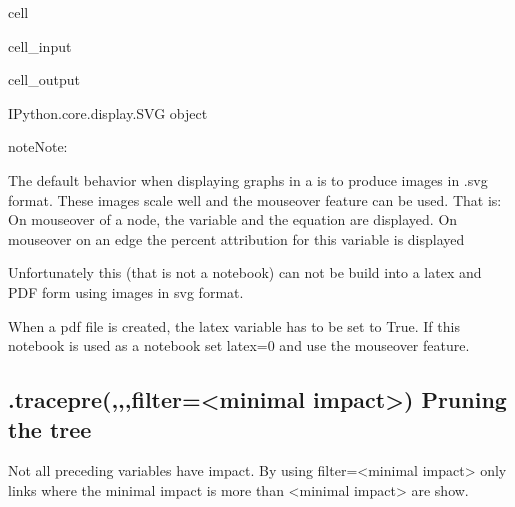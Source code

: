 \documentclass[letterpaper,10pt,english]{jupyterBook}
\begin{document}
\begin{sphinxuseclass}{cell}\begin{sphinxVerbatimInput}

\begin{sphinxuseclass}{cell_input}
\begin{sphinxVerbatim}[commandchars=\\\{\}]
\end{sphinxVerbatim}

\end{sphinxuseclass}\end{sphinxVerbatimInput}
\begin{sphinxVerbatimOutput}

\begin{sphinxuseclass}{cell_output}
\begin{sphinxVerbatim}[commandchars=\\\{\}]
\PYGZlt{}IPython.core.display.SVG object\PYGZgt{}
\end{sphinxVerbatim}

\end{sphinxuseclass}\end{sphinxVerbatimOutput}

\end{sphinxuseclass}
\begin{sphinxadmonition}{note}{Note:}
\sphinxAtStartPar
{}

\sphinxAtStartPar
The default behavior when displaying graphs in a  is to produce images in .svg format.
These images scale well and the mouseover
feature can be used. That is: On mouseover of a node, the variable and the equation are displayed.
On mouseover on an edge the percent attribution for this variable is displayed

\sphinxAtStartPar
Unfortunately this  (that is not a notebook) can not be build into a latex and PDF  form using images in svg format.

\sphinxAtStartPar
When a  pdf file is created, the latex variable has to be set to True. If this notebook is used as a notebook set latex=0 and use the mouseover feature.
\end{sphinxadmonition}


\subsection{.tracepre(,,,filter=<minimal impact>) Pruning the tree}
\label{\detokenize{content/howto/structure/Logical_structure:tracepre-filter-minimal-impact-pruning-the-tree}}
\sphinxAtStartPar
Not all preceding variables have impact. By using filter=<minimal impact> only  links where the minimal impact is more than <minimal impact> are show.
\end{document}
